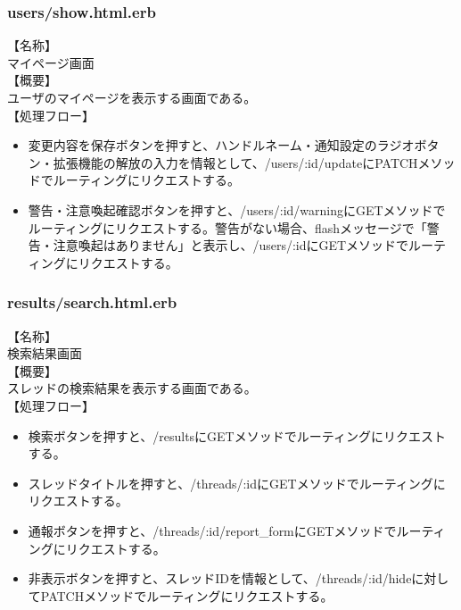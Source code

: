 \documentclass[a4j]{jarticle}
\begin{document}
\subsubsection{users/show.html.erb}
\noindent
【名称】\\
マイページ画面\\
【概要】\\
ユーザのマイページを表示する画面である。\\
【処理フロー】
\begin{itemize}
  \item 変更内容を保存ボタンを押すと、ハンドルネーム・通知設定のラジオボタン・拡張機能の解放の入力を情報として、/users/:id/updateにPATCHメソッドでルーティングにリクエストする。
  \item 警告・注意喚起確認ボタンを押すと、/users/:id/warningにGETメソッドでルーティングにリクエストする。警告がない場合、flashメッセージで「警告・注意喚起はありません」と表示し、/users/:idにGETメソッドでルーティングにリクエストする。
\end{itemize}

\subsubsection{results/search.html.erb}
\noindent
【名称】\\
検索結果画面\\
【概要】\\
スレッドの検索結果を表示する画面である。\\
【処理フロー】
\begin{itemize}
  \item 検索ボタンを押すと、/resultsにGETメソッドでルーティングにリクエストする。
  \item スレッドタイトルを押すと、/threads/:idにGETメソッドでルーティングにリクエストする。
  \item 通報ボタンを押すと、/threads/:id/report\_formにGETメソッドでルーティングにリクエストする。
  \item 非表示ボタンを押すと、スレッドIDを情報として、/threads/:id/hideに対してPATCHメソッドでルーティングにリクエストする。
\end{itemize}
\end{document}
